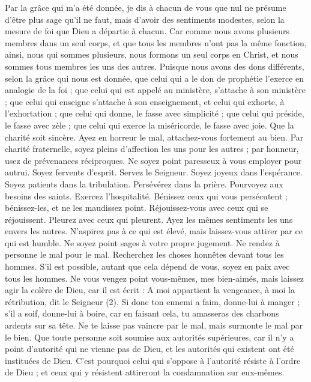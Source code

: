 \begin{multicols}{2}
Par la grâce qui m’a été donnée, je dis à chacun de vous que nul ne présume d'être plus sage qu'il ne faut, mais d’avoir des sentiments modestes, selon la mesure de foi que Dieu a départie à chacun.
Car comme nous avons plusieurs membres dans un seul corps, et que tous les membres n'ont pas la même fonction,
ainsi, nous qui sommes plusieurs, nous formons un seul corps en Christ, et nous sommes tous membres les uns des autres.
Puisque nous avons des dons différents, selon la grâce qui nous est donnée, que celui qui a le don de prophétie l’exerce en analogie de la foi ;
que celui qui est appelé au ministère, s’attache à son ministère ; que celui qui enseigne s’attache à son enseignement,
et celui qui exhorte, à l’exhortation ; que celui qui donne, le fasse avec simplicité ; que celui qui préside, le fasse avec zèle ; que celui qui exerce la miséricorde, le fasse avec joie.
Que la charité soit sincère. Ayez en horreur le mal, attachez-vous fortement au bien.
Par charité fraternelle, soyez pleins d’affection les uns pour les autres ; par honneur, usez de prévenances réciproques.
Ne soyez point paresseux à vous employer pour autrui. Soyez fervents d'esprit. Servez le Seigneur.
Soyez joyeux dans l'espérance. Soyez patients dans la tribulation. Persévérez dans la prière.
Pourvoyez aux besoins des saints. Exercez l'hospitalité.
Bénissez ceux qui vous persécutent ; bénissez-les, et ne les maudissez point.
Réjouissez-vous avec ceux qui se réjouissent. Pleurez avec ceux qui pleurent.
Ayez les mêmes sentiments les uns envers les autres. N’aspirez pas à ce qui est élevé, mais laissez-vous attirer par ce qui est humble. Ne soyez point sages à votre propre jugement.
Ne rendez à personne le mal pour le mal. Recherchez les choses honnêtes devant tous les hommes.
S’il est possible, autant que cela dépend de vous, soyez en paix avec tous les hommes.
Ne vous vengez point vous-mêmes, mes bien-aimés, mais laissez agir la colère de Dieu, car il est écrit : A moi appartient la vengeance, à moi la rétribution, dit le Seigneur (2).
Si donc ton ennemi a faim, donne-lui à manger ; s'il a soif, donne-lui à boire, car en faisant cela, tu amasseras des charbons ardents sur sa tête.
Ne te laisse pas vaincre par le mal, mais surmonte le mal par le bien.
\VerseOne{}Que toute personne soit soumise aux autorités supérieures, car il n'y a point d’autorité qui ne vienne pas de Dieu, et les autorités qui existent ont été instituées de Dieu.
C'est pourquoi celui qui s’oppose à l’autorité résiste à l’ordre de Dieu ; et ceux qui y résistent attireront la condamnation sur eux-mêmes.

\end{multicols}
